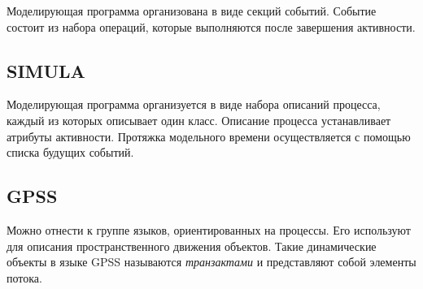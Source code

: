 Моделирующая программа организована в виде секций событий. Событие состоит из набора операций, которые выполняются после завершения активности.

\subsection{SIMULA}

Моделирующая программа организуется в виде набора описаний процесса, каждый из которых описывает один класс. Описание процесса устанавливает атрибуты активности. Протяжка модельного времени осуществляется с помощью списка будущих событий.

\subsection{GPSS}

Можно отнести к группе языков, ориентированных на процессы. Его используют для описания пространственного движения объектов. Такие динамические объекты в языке GPSS называются \textit{транзактами} и представляют собой элементы потока.

